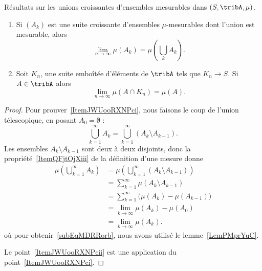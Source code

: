 \begin{lemma}\label{LemAZGByEs}
	Résultats sur les unions croissantes d'ensembles mesurables dans \( (S,\tribA,\mu)\).
	\begin{enumerate}
		\item\label{ItemJWUooRXNPci}
		      Si \( (A_k)\) est une suite croissante d'ensembles \( \mu\)-mesurables dont l'union est mesurable, alors
		      \begin{equation}
			      \lim_{n\to \infty} \mu(A_k)=\mu(\bigcup_kA_k).
		      \end{equation}

		\item\label{ItemJWUooRXNPcii}
		      Soit \( K_n\), une suite emboîtée d'éléments de \( \tribA\) tels que \( K_n\to S\). Si \( A\in\tribA\) alors
		      \begin{equation}
			      \lim_{n\to \infty} \mu(A\cap K_n)=\mu(A).
		      \end{equation}
	\end{enumerate}
\end{lemma}

\begin{proof}
	Pour prouver~\ref{ItemJWUooRXNPci}, nous faisons le coup de l'union télescopique, en posant \( A_0=\emptyset\) :
	\begin{equation}
		\bigcup_{k=1}^{\infty}A_k=\bigcup_{k=1}^{\infty}(A_k\setminus A_{k-1}).
	\end{equation}
	Les ensembles \( A_k\setminus A_{k-1}\) sont deux à deux disjoints, donc la propriété~\ref{ItemQFjtOjXiii} de la définition d'une mesure donne
	\begin{subequations}
		\begin{align}
			\mu(\bigcup_{k=1}^{\infty}A_k) & =\mu\left( \bigcup_{k=1}^{\infty}(A_k\setminus A_{k-1}) \right)              \\
			                               & =\sum_{k=1}^{\infty}\mu(A_k\setminus A_{k-1})                                \\
			                               & =\sum_{k=1}^{\infty}\big( \mu(A_k)-\mu(A_{k-1}) \big)   \label{subEqMDRRorb} \\
			                               & =\lim_{k\to \infty} \mu(A_k)-\mu(A_0)                                        \\
			                               & =\lim_{k\to \infty} \mu(A_k).
		\end{align}
	\end{subequations}
	où pour obtenir~\ref{subEqMDRRorb}, nous avons utilisé le lemme~\ref{LemPMprYuC}.

	Le point~\ref{ItemJWUooRXNPcii} est une application du point~\ref{ItemJWUooRXNPci}.
\end{proof}

